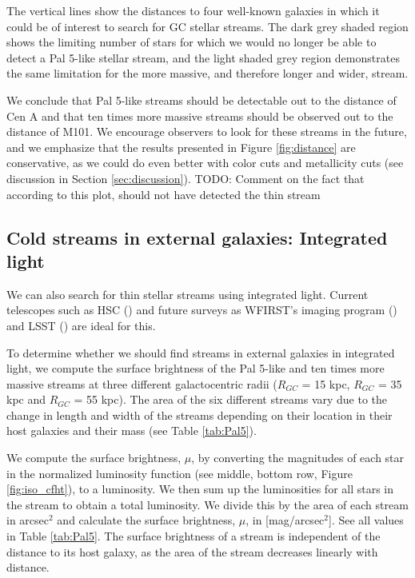 \documentclass[twocolumn]{aastex62}
\newcommand{\todo}[1]{{\color{red} TODO: #1}}
\begin{document}
The vertical lines show the distances to four well-known galaxies in which it could be of interest to search for GC stellar streams. The dark grey shaded region shows the limiting number of stars for which we would no longer be able to detect a Pal 5-like stellar stream, and the light shaded grey region demonstrates the same limitation for the more massive, and therefore longer and wider, stream. 

We conclude that Pal 5-like streams should be detectable out to the distance of Cen A and that ten times more massive streams should be observed out to the distance of M101. We encourage observers to look for these streams in the future, and we emphasize that the results presented in Figure \ref{fig:distance} are conservative, as we could do even better with color cuts and metallicity cuts (see discussion in Section \ref{sec:discussion}). \todo{Comment on the fact that according to this plot, \citet{abraham18} should not have detected the thin stream}

\subsection{Cold streams in external galaxies: Integrated light}
\label{sec:integrated}
We can also search for thin stellar streams using integrated light. Current telescopes such as HSC (\citealt{miyazaki12}) and future surveys as WFIRST's imaging program (\citealt{spergel13}) and LSST  (\citealt{ivezi08}) are ideal for this. 

To determine whether we should find streams in external galaxies in integrated light, we compute the surface brightness of the Pal 5-like and ten times more massive streams at three different galactocentric radii ($R_{GC}$ = 15  kpc, $R_{GC}$ = 35 kpc and $R_{GC}$ = 55 kpc). The area of the six different streams vary due to the change in length and width of the streams depending on their location in their host galaxies and their mass (see Table \ref{tab:Pal5}).

We compute the surface brightness, $\mu$, by converting the magnitudes of each star in the normalized luminosity function (see middle, bottom row, Figure \ref{fig:iso_cfht}), to a luminosity. We then sum up the luminosities for all stars in the stream to obtain a total luminosity. We divide this by the area of each stream in arcsec$^2$ and calculate the surface brightness, $\mu$, in [mag/arcsec$^2$]. See all values in Table \ref{tab:Pal5}. The surface brightness of a stream is independent of the distance to its host galaxy, as the area of the stream decreases linearly with distance. 
\end{document}
